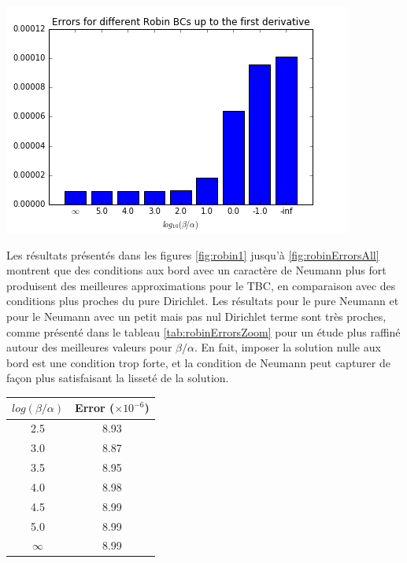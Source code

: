 \begingroup
\begin{center}
		\includegraphics[scale=.6]{figures/robinErrors1.png}
\end{center}
\endgroup

\indent Les résultats présentés dans les figures \ref{fig:robin1} jusqu'à \ref{fig:robinErrorsAll} montrent que des conditions aux bord avec un caractère de Neumann plus fort produisent des meilleures approximations pour le TBC, en comparaison avec des conditions plus proches du pure Dirichlet. Les résultats pour le pure Neumann et pour le Neumann avec un petit mais pas nul Dirichlet terme sont très proches, comme présenté dans le tableau \ref{tab:robinErrorsZoom} pour un étude plus raffiné autour des meilleures valeurs pour $\beta/\alpha$. En fait, imposer la solution nulle aux bord est une condition trop forte, et la condition de Neumann peut capturer de façon plus satisfaisant la lisseté de la solution.

\begingroup
\begin{center}
		\begin{tabular}{c|c}
			$log(\beta/\alpha)$ & Error ($\times 10^{-6}$) \\
			\hline
			2.5 & 8.93\\
			3.0 & 8.87\\
			3.5 & 8.95\\
			4.0 & 8.98\\
			4.5 & 8.99\\
			5.0 & 8.99\\
			$\infty$ & 8.99	
		\end{tabular}
\end{center}
\endgroup

